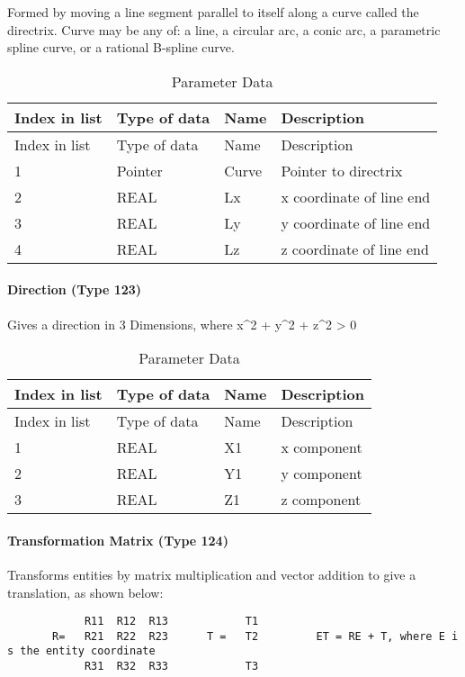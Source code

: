 Formed by moving a line segment parallel to itself along a curve called
the directrix. Curve may be any of: a line, a circular arc, a conic arc,
a parametric spline curve, or a rational B-spline curve.

\begin{longtable}[c]{@{}llll@{}}
\caption{Parameter Data}\tabularnewline
\toprule
Index in list & Type of data & Name & Description\tabularnewline
\midrule
\endfirsthead
\toprule
Index in list & Type of data & Name & Description\tabularnewline
\midrule
\endhead
1 & Pointer & Curve & Pointer to directrix\tabularnewline
2 & REAL & Lx & x coordinate of line end\tabularnewline
3 & REAL & Ly & y coordinate of line end\tabularnewline
4 & REAL & Lz & z coordinate of line end\tabularnewline
\bottomrule
\end{longtable}

\paragraph{Direction (Type 123)}\label{direction-type-123}

Gives a direction in 3 Dimensions, where x\^{}2 + y\^{}2 + z\^{}2
\textgreater{} 0

\begin{longtable}[c]{@{}llll@{}}
\caption{Parameter Data}\tabularnewline
\toprule
Index in list & Type of data & Name & Description\tabularnewline
\midrule
\endfirsthead
\toprule
Index in list & Type of data & Name & Description\tabularnewline
\midrule
\endhead
1 & REAL & X1 & x component\tabularnewline
2 & REAL & Y1 & y component\tabularnewline
3 & REAL & Z1 & z component\tabularnewline
\bottomrule
\end{longtable}

\paragraph{Transformation Matrix (Type
124)}\label{transformation-matrix-type-124}

Transforms entities by matrix multiplication and vector addition to give
a translation, as shown below:

\texttt{~~~~~~~~~~~\textbar{}~R11~~R12~~R13~\textbar{}~~~~~~~~~~\textbar{}~T1~\textbar{}~~~~~~~~~~~~~~}\\\texttt{~~~~~~~R=~~\textbar{}~R21~~R22~~R23~\textbar{}~~~~~T~=~~\textbar{}~T2~\textbar{}~~~~~~~~ET~=~RE~+~T,~where~E~is~the~entity~coordinate~}\\\texttt{~~~~~~~~~~~\textbar{}~R31~~R32~~R33~\textbar{}~~~~~~~~~~\textbar{}~T3~\textbar{}~~~~~~~~~~~}

